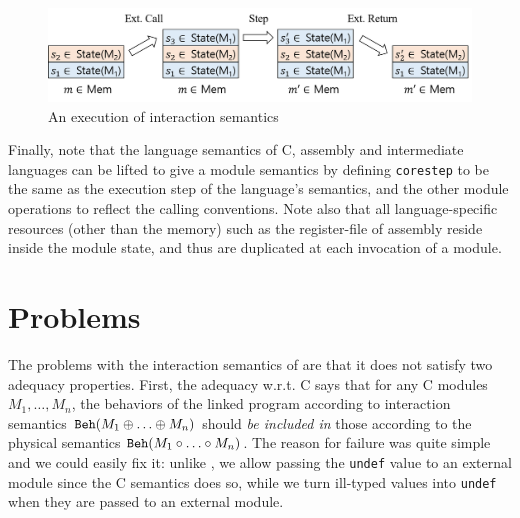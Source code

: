 \begin{figure}[t]
\includegraphics[width=0.9\linewidth]{images/intersem.png}
\caption{An execution of interaction semantics}
\label{fig:inter-sem}
\end{figure}


Finally, note that the language semantics of C, assembly and
intermediate languages can be lifted to give a module semantics by
defining \texttt{corestep} to be the same as the execution step of the
language's semantics, and the other module operations to reflect the
calling conventions. Note also that all language-specific resources
(\ie other than the memory)
such as the register-file of assembly 
reside inside the module state, and thus are
duplicated at each invocation of a module.


\section{Problems}
\label{sec:overview-semantics:problems}

The problems with the interaction semantics of \ccc{} are that it does
not satisfy two adequacy properties. First, the adequacy w.r.t. C says
that for any C modules $M_1,\ldots,M_n$, the behaviors of the linked
program according to interaction semantics $\mathtt{Beh}({M_1 \oplus
  \ldots \oplus M_n})$ should \emph{be included in} those according to the
physical semantics $\mathtt{Beh}({M_1 \circ \ldots\circ M_n})$.  The reason for
failure was quite simple and we could easily fix it: unlike \ccc{}, we allow passing
the \texttt{undef} value to an external module since the C semantics
does so, while we turn ill-typed values into \texttt{undef} when they
are passed to an external module.

